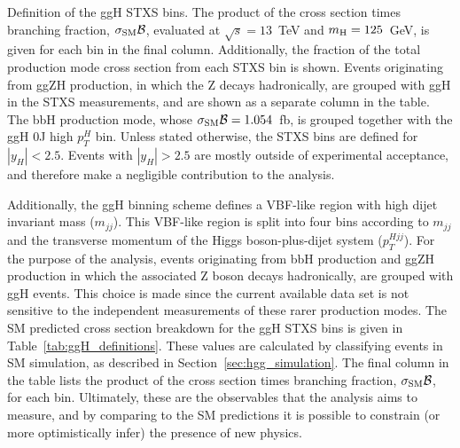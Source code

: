 \begin{table}
    \caption[ggH STXS bin definitions]{Definition of the ggH STXS bins. The product of the cross section times \Hgg branching fraction, $\sigma_{\rm{SM}}\mathcal{B}$, evaluated at $\sqrt{s}=13$~TeV and $m_{\rm{H}}=125$~GeV, is given for each bin in the final column. Additionally, the fraction of the total production mode cross section from each STXS bin is shown. Events originating from ggZH production, in which the Z decays hadronically, are grouped with ggH in the STXS measurements, and are shown as a separate column in the table. The bbH production mode, whose $\sigma_{\rm{SM}}\mathcal{B}=1.054$~fb, is grouped together with the ggH 0J high $p_T^H$ bin. Unless stated otherwise, the STXS bins are defined for $|y_H|<2.5$. Events with $|y_H|>2.5$ are mostly outside of experimental acceptance, and therefore make a negligible contribution to the \Hgg analysis.}
    \label{tab:ggH_definitions}
    \centering
    \scriptsize
    \renewcommand{\arraystretch}{1.2}
    \setlength{\tabcolsep}{3pt}
    \hspace*{-3cm}
    
    \hspace*{-3cm}
\end{table}

Additionally, the ggH binning scheme defines a VBF-like region with high dijet invariant mass ($m_{jj}$). This VBF-like region is split into four bins according to $m_{jj}$ and the transverse momentum of the Higgs boson-plus-dijet system ($p_T^{Hjj}$). For the purpose of the \Hgg analysis, events originating from bbH production and ggZH production in which the associated Z boson decays hadronically, are grouped with ggH events. This choice is made since the current available data set is not sensitive to the independent measurements of these rarer production modes. The SM predicted cross section breakdown for the ggH STXS bins is given in Table~\ref{tab:ggH_definitions}. These values are calculated by classifying events in SM simulation, as described in Section~\ref{sec:hgg_simulation}. The final column in the table lists the product of the cross section times \Hgg branching fraction, $\sigma_{\rm{SM}}\mathcal{B}$, for each bin. Ultimately, these are the observables that the \Hgg analysis aims to measure, and by comparing to the SM predictions it is possible to constrain (or more optimistically infer) the presence of new physics.

